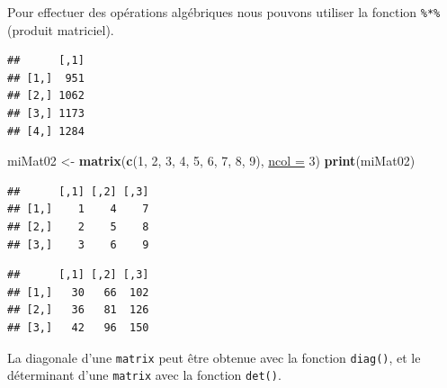 \documentclass[twoside,symmetric]{book}
\newenvironment{Shaded}{}{}
\newcommand{\CommentTok}[1]{\textit{#1}}
\newcommand{\DataTypeTok}[1]{\underline{#1}}
\newcommand{\DecValTok}[1]{#1}
\newcommand{\KeywordTok}[1]{\textbf{#1}}
\newcommand{\NormalTok}[1]{#1}
\newcommand{\OperatorTok}[1]{#1}
\newcommand{\StringTok}[1]{#1}
\begin{document}
Pour effectuer des opérations algébriques nous pouvons utiliser la fonction \texttt{\%*\%} (produit matriciel).

\begin{Shaded}
\end{Shaded}

\begin{verbatim}
##      [,1]
## [1,]  951
## [2,] 1062
## [3,] 1173
## [4,] 1284
\end{verbatim}

\begin{Shaded}
\begin{Highlighting}[]
\NormalTok{miMat02 <-}\StringTok{ }\KeywordTok{matrix}\NormalTok{(}\KeywordTok{c}\NormalTok{(}\DecValTok{1}\NormalTok{, }\DecValTok{2}\NormalTok{, }\DecValTok{3}\NormalTok{, }\DecValTok{4}\NormalTok{, }\DecValTok{5}\NormalTok{, }\DecValTok{6}\NormalTok{, }\DecValTok{7}\NormalTok{, }\DecValTok{8}\NormalTok{, }\DecValTok{9}\NormalTok{), }\DataTypeTok{ncol =} \DecValTok{3}\NormalTok{)}
\KeywordTok{print}\NormalTok{(miMat02)}
\end{Highlighting}
\end{Shaded}

\begin{verbatim}
##      [,1] [,2] [,3]
## [1,]    1    4    7
## [2,]    2    5    8
## [3,]    3    6    9
\end{verbatim}

\begin{Shaded}
\end{Shaded}

\begin{verbatim}
##      [,1] [,2] [,3]
## [1,]   30   66  102
## [2,]   36   81  126
## [3,]   42   96  150
\end{verbatim}

La diagonale d'une \texttt{matrix} peut être obtenue avec la fonction \texttt{diag()}, et le déterminant d'une \texttt{matrix} avec la fonction \texttt{det()}.
\end{document}

